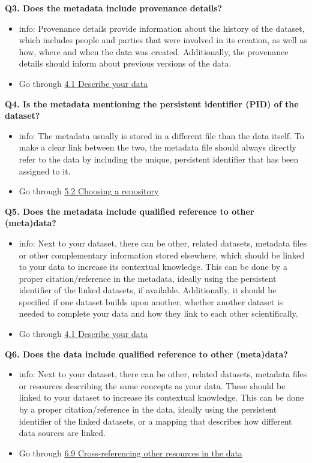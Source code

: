 \documentclass[
]{book}
\providecommand{\tightlist}{%
  \setlength{\itemsep}{0pt}\setlength{\parskip}{0pt}}
\begin{document}
\textbf{Q3. Does the metadata include provenance details?}

\begin{itemize}
\tightlist
\item
  info: Provenance details provide information about the history of the dataset, which includes people and parties that were involved in its creation, as well as how, where and when the data was created. Additionally, the provenance details should inform about previous versions of the data.
\item
  Go through \protect\hyperlink{describe-data}{4.1 Describe your data}
\end{itemize}

\textbf{Q4. Is the metadata mentioning the persistent identifier (PID) of the dataset?}

\begin{itemize}
\tightlist
\item
  info: The metadata usually is stored in a different file than the data itself. To make a clear link between the two, the metadata file should always directly refer to the data by including the unique, persistent identifier that has been assigned to it.
\item
  Go through \protect\hyperlink{choosing-a-repository}{5.2 Choosing a repository}
\end{itemize}

\textbf{Q5. Does the metadata include qualified reference to other (meta)data?}

\begin{itemize}
\tightlist
\item
  info: Next to your dataset, there can be other, related datasets, metadata files or other complementary information stored elsewhere, which should be linked to your data to increase its contextual knowledge. This can be done by a proper citation/reference in the metadata, ideally using the persistent identifier of the linked datasets, if available. Additionally, it should be specified if one dataset builds upon another, whether another dataset is needed to complete your data and how they link to each other scientifically.
\item
  Go through \protect\hyperlink{describe-data}{4.1 Describe your data}
\end{itemize}

\textbf{Q6. Does the data include qualified reference to other (meta)data?}

\begin{itemize}
\tightlist
\item
  info: Next to your dataset, there can be other, related datasets, metadata files or resources describing the same concepts as your data. These should be linked to your dataset to increase its contextual knowledge. This can be done by a proper citation/reference in the data, ideally using the persistent identifier of the linked datasets, or a mapping that describes how different data sources are linked.
\item
  Go through \protect\hyperlink{crossref-in-data}{6.9 Cross-referencing other resources in the data}
\end{itemize}
\end{document}
